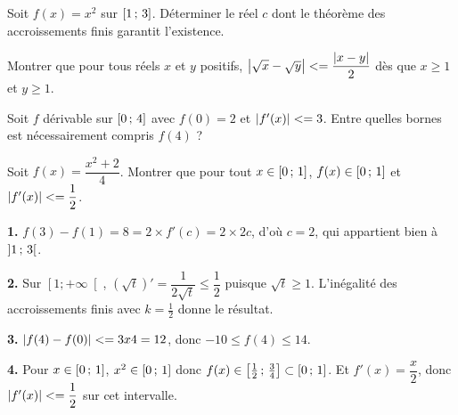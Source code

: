\begin{entrainement}
\exo[\niveau{1}] Soit $f(x) = x^{2}$ sur $\left[1\,;\,3\right]$. Déterminer le
réel $c$ dont le théorème des accroissements finis garantit l'existence.

\exo[\niveau{2}] Montrer que pour tous réels $x$ et $y$ positifs,
$\left|\sqrt{x}-\sqrt{y}\right| <= \dfrac{\left|x-y\right|}{2}$ dès que $x \geq 1$ et
$y \geq 1$.

\exo[\niveau{2}] Soit $f$ dérivable sur $\left[0\,;\,4\right]$ avec $f(0) = 2$ et
$\left|f'(x)\right| <= 3$. Entre quelles bornes est nécessairement compris $f(4)$ ?

\exo[\niveau{3}] Soit $f(x) = \dfrac{x^{2}+2}{4}$. Montrer que pour tout
$x \in \left[0\,;\,1\right]$, $f(x) \in \left[0\,;\,1\right]$ et
$\left|f'(x)\right| <= \dfrac{1}{2}$.
\end{entrainement}

\begin{corrige}
\textbf{1.} $f(3)-f(1) = 8 = 2 \times f'(c) = 2 \times 2c$, d'où $c = 2$, qui
appartient bien à $\left]1\,;\,3\right[$.

\textbf{2.} Sur $\left[1 ; +\infty\right[$,
$\left(\sqrt{t}\right)' = \dfrac{1}{2\sqrt{t}} \leq \dfrac{1}{2}$ puisque
$\sqrt{t} \geq 1$. L'inégalité des accroissements finis avec $k = \tfrac{1}{2}$
donne le résultat.

\textbf{3.} $\left|f(4)-f(0)\right| <= 3 x 4 = 12$, donc
$-10 \leq f(4) \leq 14$.

\textbf{4.} Pour $x \in \left[0\,;\,1\right]$, $x^{2} \in \left[0\,;\,1\right]$ donc
$f(x) \in \left[\tfrac{1}{2}\,;\,\tfrac{3}{4}\right] \subset \left[0\,;\,1\right]$.
Et $f'(x) = \dfrac{x}{2}$, donc $\left|f'(x)\right| <= \dfrac{1}{2}$ sur cet
intervalle.
\end{corrige}

